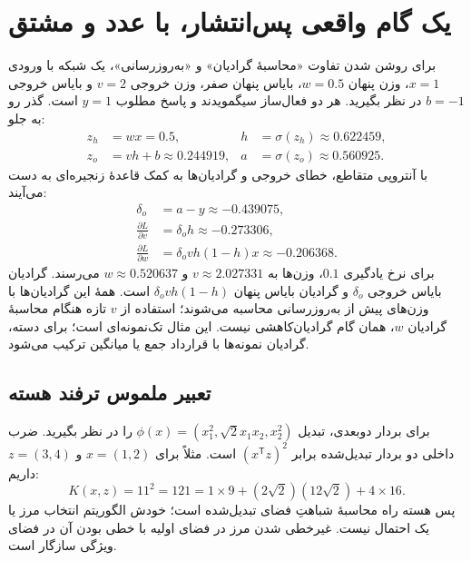 \documentclass[12pt,a4paper,oneside]{report}
\begin{document}
\section{یک گام واقعی پس‌انتشار، با عدد و مشتق}
برای روشن شدن تفاوت «محاسبهٔ گرادیان» و «به‌روزرسانی»، یک شبکه با ورودی $x=1$، وزن پنهان $w=0.5$، بایاس پنهان صفر، وزن خروجی $v=2$ و بایاس خروجی $b=-1$ در نظر بگیرید. هر دو فعال‌ساز سیگمویدند و پاسخ مطلوب $y=1$ است. گذر رو به جلو:
\begin{align*}
z_h&=wx=0.5,& h&=\sigma(z_h)\approx0.622459,\\
z_o&=vh+b\approx0.244919,& a&=\sigma(z_o)\approx0.560925.
\end{align*}
با آنتروپی متقاطع، خطای خروجی و گرادیان‌ها به کمک قاعدهٔ زنجیره‌ای به دست می‌آیند:
\begin{align*}
\delta_o&=a-y\approx-0.439075,\\
\frac{\partial L}{\partial v}&=\delta_o h\approx-0.273306,\\
\frac{\partial L}{\partial w}&=\delta_o v h(1-h)x\approx-0.206368.
\end{align*}
برای نرخ یادگیری $0.1$، وزن‌ها به $v\approx2.027331$ و $w\approx0.520637$ می‌رسند. گرادیان بایاس خروجی $\delta_o$ و گرادیان بایاس پنهان $\delta_o v h(1-h)$ است. همهٔ این گرادیان‌ها با وزن‌های پیش از به‌روزرسانی محاسبه می‌شوند؛ استفاده از $v$ تازه هنگام محاسبهٔ گرادیان $w$، همان گام گرادیان‌کاهشی نیست. این مثال تک‌نمونه‌ای است؛ برای دسته، گرادیان نمونه‌ها با قرارداد جمع یا میانگین ترکیب می‌شود.

\subsection*{تعبیر ملموس ترفند هسته}
برای بردار دوبعدی، تبدیل $\phi(x)=(x_1^2,\sqrt2x_1x_2,x_2^2)$ را در نظر بگیرید. ضرب داخلی دو بردار تبدیل‌شده برابر $(x^\mathsf Tz)^2$ است. مثلاً برای $x=(1,2)$ و $z=(3,4)$ داریم:
\[K(x,z)=11^2=121=1\times9+(2\sqrt2)(12\sqrt2)+4\times16.\]
پس هسته راه محاسبهٔ شباهتِ فضای تبدیل‌شده است؛ خودش الگوریتم انتخاب مرز یا یک احتمال نیست. غیرخطی شدن مرز در فضای اولیه با خطی بودن آن در فضای ویژگی سازگار است.
\end{document}
